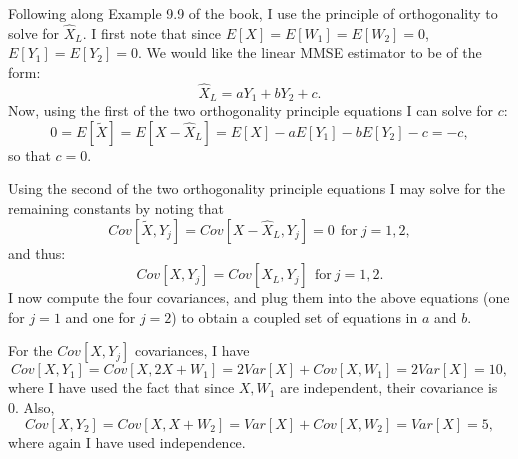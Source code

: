 \begin{problem}{8}Following along Example 9.9 of the book, I use the principle of orthogonality to solve for $\hat X_L$.  I first note that since $E[X]=E[W_1]=E[W_2]=0$, $E[Y_1]=E[Y_2]=0$.  We would like the linear MMSE estimator to be of the form:
\begin{equation*}
\hat X_L =a Y_1+bY_2+c.
\end{equation*}
Now, using the first of the two orthogonality principle equations I can solve for $c$:
\begin{equation*}
0 = E[\tilde X] = E[X - \hat X_L]=E[X] - aE[Y_1]-bE[Y_2]-c = -c,
\end{equation*}
so that $c=0$.

Using the second of the two orthogonality principle equations I may solve for the remaining constants by noting that
\begin{equation*}
Cov[\tilde X, Y_j] = Cov[X-\hat X_L, Y_j] = 0~~\mathrm{for}~j=1, 2,
\end{equation*}
and thus:
\begin{equation*}
Cov[X, Y_j] = Cov[\hat X_L, Y_j]~~\mathrm{for}~j=1, 2.
\end{equation*}
I now compute the four covariances, and plug them into the above equations (one for $j=1$ and one for $j=2$) to obtain a coupled set of equations in $a$ and $b$.

For the $Cov[X, Y_j]$ covariances, I have
\begin{equation*}
Cov[X, Y_1] = Cov[X, 2X+W_1]=2Var[X]+Cov[X, W_1] = 2Var[X]=10,
\end{equation*}
where I have used the fact that since $X, W_1$ are independent, their covariance is 0.  Also, 
\begin{equation*}
Cov[X, Y_2] = Cov[X, X+W_2]=Var[X]+Cov[X, W_2] = Var[X]=5,
\end{equation*}
where again I have used independence.


\end{problem}
